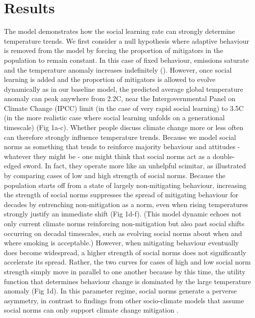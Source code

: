 \documentclass[10pt,letterpaper]{article}
\begin{document}
\section*{Results}
The model demonstrates how the social learning rate can strongly determine temperature trends. We first consider a null hypothesis where adaptive behaviour is removed from the model by forcing the proportion of mitigators in the population to remain constant. In this case of fixed behaviour, emissions saturate and the temperature anomaly increases indefinitely (). However, once social learning is added and the proportion of mitigators is allowed to evolve dynamically as in our baseline model, the predicted average global temperature anomaly can peak anywhere from 2.2\degree C, near the Intergovernmental Panel on Climate Change (IPCC) limit\cite{schnoor07} (in the case of very rapid social learning) to 3.5\degree C (in the more realistic case where social learning unfolds on a generational timescale) (Fig 1a-c). Whether people discuss climate change more or less often can therefore strongly influence temperature trends. 
Because we model social norms as something that tends to reinforce majority behaviour and attitudes - whatever they might be - one might think that social norms act as a double-edged sword. In fact, they operate more like an unhelpful scimitar, as illustrated by comparing cases of low and high strength of social norms. Because the population starts off from a state of largely non-mitigating behaviour, increasing the strength of social norms suppresses the spread of mitigating behaviour for decades by entrenching non-mitigation as a norm, even when rising temperatures strongly justify an immediate shift (Fig 1d-f). (This model dynamic echoes not only current climate norms reinforcing non-mitigation \cite{stoll01} but also past social shifts occurring on decadal timescales, such as evolving social norms about when and where smoking is acceptable.) However, when mitigating behaviour eventually does become widespread, a higher strength of social norms does not significantly accelerate its spread. Rather, the two curves for cases of high and low social norm strength simply move in parallel to one another because by this time, the utility function that determines behaviour change is dominated by the large temperature anomaly (Fig 1d). In this parameter regime, social norms generate a perverse asymmetry, in contrast to findings from other socio-climate models that assume social norms can only support climate change mitigation \cite{stoll01}.
\end{document}
